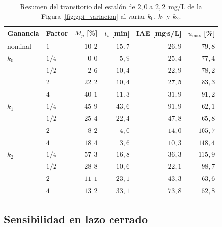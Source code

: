 \begin{table}[tbp]
\centering
\caption[Resumen del transitorio del GPI al variar sus ganancias]{Resumen del
transitorio del escalón de $2{,}0$ a $2{,}2$~mg/L de la
Figura~\ref{fig:gpi_variacion} al variar $k_0$, $k_1$ y $k_2$.}
\label{tab:gpi_transitorio}
\small
\begin{tabular}{llrrrr}
\toprule
\textbf{Ganancia} & \textbf{Factor} & $M_p$ [\%] & $t_s$ [min] & IAE [mg$\cdot$s/L] & $u_{\max}$ [\%] \\
\midrule
nominal & $1$    & $10{,}2$  & $15{,}7$  & $26{,}9$ & $79{,}8$ \\
\midrule
$k_0$   & $1/4$  & $0{,}0$   & $5{,}9$   & $25{,}4$ & $77{,}4$ \\
        & $1/2$  & $2{,}6$   & $10{,}4$  & $22{,}9$ & $78{,}2$ \\
        & $2$    & $22{,}2$  & $10{,}4$  & $27{,}5$ & $83{,}3$ \\
        & $4$    & $40{,}1$  & $11{,}3$  & $31{,}9$ & $91{,}2$ \\
\midrule
$k_1$   & $1/4$  & $45{,}9$  & $43{,}6$  & $91{,}9$ & $62{,}1$ \\
        & $1/2$  & $25{,}4$  & $22{,}4$  & $47{,}8$ & $65{,}8$ \\
        & $2$    & $8{,}2$   & $4{,}0$   & $14{,}0$ & $105{,}7$ \\
        & $4$    & $18{,}4$  & $3{,}6$   & $10{,}3$ & $148{,}4$ \\
\midrule
$k_2$   & $1/4$  & $57{,}3$  & $16{,}8$  & $36{,}3$ & $115{,}9$ \\
        & $1/2$  & $28{,}8$  & $10{,}6$  & $22{,}1$ & $98{,}7$ \\
        & $2$    & $11{,}1$  & $23{,}1$  & $43{,}3$ & $63{,}6$ \\
        & $4$    & $13{,}2$  & $33{,}1$  & $73{,}8$ & $52{,}8$ \\
\bottomrule
\end{tabular}
\end{table}

\subsection{Sensibilidad en lazo cerrado}
\label{subsec:gpi_caso_sensibilidad}

